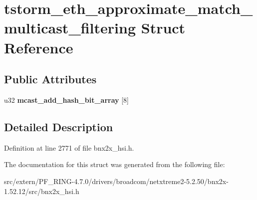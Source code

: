 \hypertarget{structtstorm__eth__approximate__match__multicast__filtering}{
\section{tstorm\_\-eth\_\-approximate\_\-match\_\-multicast\_\-filtering Struct Reference}
\label{structtstorm__eth__approximate__match__multicast__filtering}
}
\subsection*{Public Attributes}
\begin{DoxyCompactItemize}
\item 
\hypertarget{structtstorm__eth__approximate__match__multicast__filtering_a49959c7b0d2d4fd81970a41bd583f784}{
u32 {\bfseries mcast\_\-add\_\-hash\_\-bit\_\-array} \mbox{[}8\mbox{]}}
\label{structtstorm__eth__approximate__match__multicast__filtering_a49959c7b0d2d4fd81970a41bd583f784}

\end{DoxyCompactItemize}


\subsection{Detailed Description}


Definition at line 2771 of file bnx2x\_\-hsi.h.



The documentation for this struct was generated from the following file:\begin{DoxyCompactItemize}
\item 
src/extern/PF\_\-RING-\/4.7.0/drivers/broadcom/netxtreme2-\/5.2.50/bnx2x-\/1.52.12/src/bnx2x\_\-hsi.h\end{DoxyCompactItemize}
